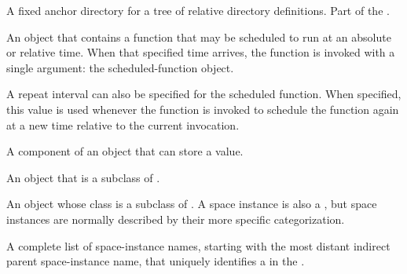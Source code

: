 \documentclass[10pt,twoside,english,pdftex]{article}
\begin{document}
\begin{glossary-list}

%
%
%
A fixed anchor directory for a tree of relative directory definitions.
Part of the .


%
%
%

An object that contains a function that may be scheduled to run at an
absolute or relative time. When that specified time arrives, the function
is invoked with a single argument: the scheduled-function object.

A repeat interval can also be specified for the scheduled
function. When specified, this value is used whenever the function is
invoked to schedule the function again at a new time relative to the
current invocation.


\glent[slot]
%
%
A component of an object that can store a value.


%
%
%
An object that is a subclass of \textbf{}.


%
%
%
%
%
An object whose class is a subclass of
\textbf{}.  A space instance is also a
, but space instances are normally described by their
more specific categorization.


%
%
%
A complete list of space-instance names, starting with the most distant
indirect parent space-instance name, that uniquely identifies a
 in the .


\end{glossary-list}
\end{document}
